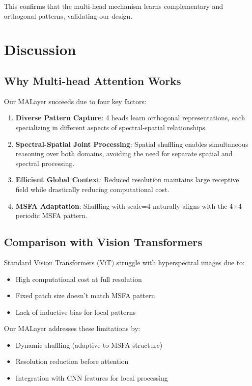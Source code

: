\documentclass[conference]{IEEEtran}
\begin{document}
This confirms that the multi-head mechanism learns complementary and orthogonal patterns, validating our design.

\section{Discussion}

\subsection{Why Multi-head Attention Works}

Our MALayer succeeds due to four key factors:

\begin{enumerate}
    \item \textbf{Diverse Pattern Capture}: 4 heads learn orthogonal representations, each specializing in different aspects of spectral-spatial relationships.
    
    \item \textbf{Spectral-Spatial Joint Processing}: Spatial shuffling enables simultaneous reasoning over both domains, avoiding the need for separate spatial and spectral processing.
    
    \item \textbf{Efficient Global Context}: Reduced resolution maintains large receptive field while drastically reducing computational cost.
    
    \item \textbf{MSFA Adaptation}: Shuffling with scale=4 naturally aligns with the 4×4 periodic MSFA pattern.
\end{enumerate}

\subsection{Comparison with Vision Transformers}

Standard Vision Transformers (ViT) struggle with hyperspectral images due to:
\begin{itemize}
    \item High computational cost at full resolution
    \item Fixed patch size doesn't match MSFA pattern
    \item Lack of inductive bias for local patterns
\end{itemize}

Our MALayer addresses these limitations by:
\begin{itemize}
    \item Dynamic shuffling (adaptive to MSFA structure)
    \item Resolution reduction before attention
    \item Integration with CNN features for local processing
\end{itemize}
\end{document}
